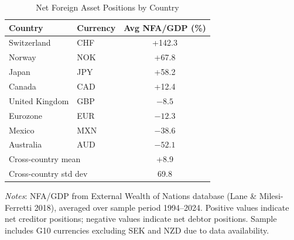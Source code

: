 \begin{table}[htbp]
\centering
\caption{Net Foreign Asset Positions by Country}
\label{tab:nfa_summary}
\begin{tabular}{llc}
\toprule
Country & Currency & Avg NFA/GDP (\%) \\
\midrule
Switzerland & CHF & +142.3 \\
Norway & NOK & +67.8 \\
Japan & JPY & +58.2 \\
Canada & CAD & +12.4 \\
United Kingdom & GBP & $-8.5$ \\
Eurozone & EUR & $-12.3$ \\
Mexico & MXN & $-38.6$ \\
Australia & AUD & $-52.1$ \\
\midrule
\multicolumn{2}{l}{Cross-country mean} & +8.9 \\
\multicolumn{2}{l}{Cross-country std dev} & 69.8 \\
\bottomrule
\end{tabular}
\begin{flushleft}
\footnotesize \textit{Notes}: NFA/GDP from External Wealth of Nations database
(Lane \& Milesi-Ferretti 2018), averaged over sample period 1994--2024.
Positive values indicate net creditor positions; negative values indicate
net debtor positions. Sample includes G10 currencies excluding SEK and NZD
due to data availability.
\end{flushleft}
\end{table}
